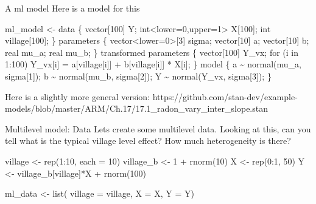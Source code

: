 \documentclass[
  11pt,
  ignorenonframetext,
]{beamer}
\newenvironment{Shaded}{\begin{snugshade}}{\end{snugshade}}
\newcommand{\AttributeTok}[1]{\textcolor[rgb]{0.40,0.45,0.13}{#1}}
\newcommand{\DecValTok}[1]{\textcolor[rgb]{0.68,0.00,0.00}{#1}}
\newcommand{\FunctionTok}[1]{\textcolor[rgb]{0.28,0.35,0.67}{#1}}
\newcommand{\NormalTok}[1]{\textcolor[rgb]{0.00,0.23,0.31}{#1}}
\newcommand{\OtherTok}[1]{\textcolor[rgb]{0.00,0.23,0.31}{#1}}
\newcommand{\SpecialCharTok}[1]{\textcolor[rgb]{0.37,0.37,0.37}{#1}}
\newcommand{\StringTok}[1]{\textcolor[rgb]{0.13,0.47,0.30}{#1}}
\begin{document}
\begin{frame}[fragile]{A ml model}
\protect\hypertarget{a-ml-model}{}
Here is a model for this

\tiny

\begin{Shaded}
\begin{Highlighting}[]
\NormalTok{ml\_model }\OtherTok{\textless{}{-}} \StringTok{\textquotesingle{}}
\StringTok{data \{}
\StringTok{  vector[100] Y;}
\StringTok{  int\textless{}lower=0,upper=1\textgreater{} X[100];}
\StringTok{  int village[100];}
\StringTok{\}}
\StringTok{parameters \{}
\StringTok{  vector\textless{}lower=0\textgreater{}[3] sigma; }
\StringTok{  vector[10] a;}
\StringTok{  vector[10] b;}
\StringTok{  real mu\_a;}
\StringTok{  real mu\_b;}
\StringTok{\}}
\StringTok{transformed parameters \{}
\StringTok{  vector[100] Y\_vx;}
\StringTok{  for (i in 1:100) Y\_vx[i] = a[village[i]] + b[village[i]] * X[i];}
\StringTok{\}}
\StringTok{model \{}
\StringTok{  a \textasciitilde{} normal(mu\_a, sigma[1]);}
\StringTok{  b \textasciitilde{} normal(mu\_b, sigma[2]);}
\StringTok{  Y \textasciitilde{} normal(Y\_vx, sigma[3]);}
\StringTok{\}}
\StringTok{\textquotesingle{}}
\end{Highlighting}
\end{Shaded}

Here is a slightly more general version:
https://github.com/stan-dev/example-models/blob/master/ARM/Ch.17/17.1\_radon\_vary\_inter\_slope.stan
\end{frame}

\begin{frame}[fragile]{Multilevel model: Data}
\protect\hypertarget{multilevel-model-data}{}
Lets create some multilevel data. Looking at this, can you tell what is
the typical village level effect? How much heterogeneity is there?

\begin{Shaded}
\begin{Highlighting}[]
\NormalTok{village   }\OtherTok{\textless{}{-}} \FunctionTok{rep}\NormalTok{(}\DecValTok{1}\SpecialCharTok{:}\DecValTok{10}\NormalTok{, }\AttributeTok{each =} \DecValTok{10}\NormalTok{)}
\NormalTok{village\_b }\OtherTok{\textless{}{-}} \DecValTok{1} \SpecialCharTok{+} \FunctionTok{rnorm}\NormalTok{(}\DecValTok{10}\NormalTok{)}
\NormalTok{X         }\OtherTok{\textless{}{-}} \FunctionTok{rep}\NormalTok{(}\DecValTok{0}\SpecialCharTok{:}\DecValTok{1}\NormalTok{, }\DecValTok{50}\NormalTok{)}
\NormalTok{Y         }\OtherTok{\textless{}{-}}\NormalTok{ village\_b[village]}\SpecialCharTok{*}\NormalTok{X }\SpecialCharTok{+} \FunctionTok{rnorm}\NormalTok{(}\DecValTok{100}\NormalTok{)}

\NormalTok{ml\_data }\OtherTok{\textless{}{-}} \FunctionTok{list}\NormalTok{(}
  \AttributeTok{village =}\NormalTok{ village,}
  \AttributeTok{X =}\NormalTok{ X, }
  \AttributeTok{Y =}\NormalTok{ Y)}
\end{Highlighting}
\end{Shaded}
\end{frame}
\end{document}

